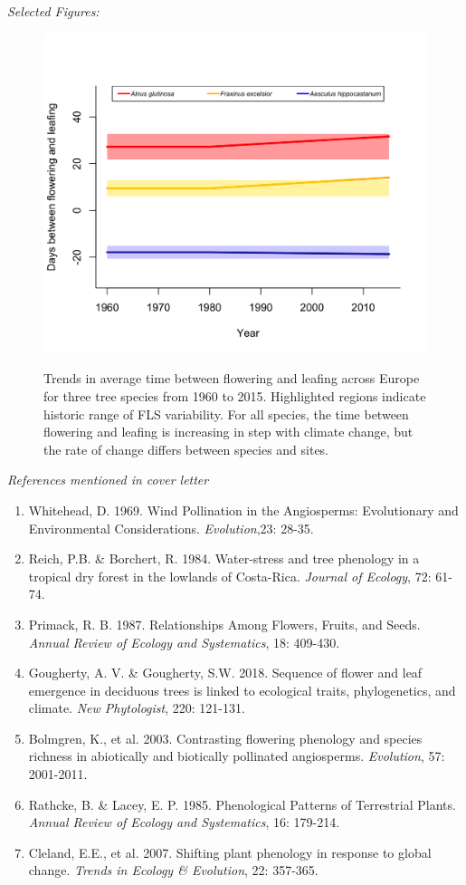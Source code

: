 \documentclass[10.5pt,a4paper]{letter}\usepackage[]{graphicx}\usepackage[]{color}
\begin{document}
\noindent \emph{Selected Figures:}\\
   \begin{figure}
 \includegraphics[width=.75\textwidth]{..//figure/FLS_climate_change.png}\\
\caption{Trends in average time between flowering and leafing across Europe for three tree species from 1960 to 2015. Highlighted regions indicate historic range of FLS variability. For all species, the time between flowering and leafing is increasing in step with climate change, but the rate of change differs between species and sites.}
    \label{fig:Figure 1}
    \end{figure}

\newpage
\noindent \emph{References mentioned in cover letter}
\begin{footnotesize}
\begin{enumerate}
\item Whitehead, D. 1969. Wind Pollination in the Angiosperms: Evolutionary and Environmental Considerations. \emph{Evolution},23: 28-35.
\item Reich, P.B. \& Borchert, R. 1984. Water-stress and tree phenology in a tropical dry forest in the lowlands of Costa-Rica. \emph{Journal of Ecology}, 72: 61-74.
\item Primack, R. B. 1987. Relationships Among Flowers, Fruits, and Seeds. \emph{Annual Review of Ecology and Systematics}, 18: 409-430.
\item Gougherty, A. V. \& Gougherty, S.W. 2018. Sequence of flower and leaf emergence in deciduous trees is linked to ecological traits, phylogenetics, and climate. \emph{New Phytologist}, 220: 121-131.
\item Bolmgren, K., et al. 2003. Contrasting flowering phenology and species richness in abiotically and biotically pollinated angiosperms. \emph{Evolution}, 57: 2001-2011.
\item Rathcke, B. \& Lacey, E. P. 1985. Phenological Patterns of Terrestrial Plants. \emph{Annual Review of Ecology and Systematics}, 16: 179-214.
\item Cleland, E.E., et al. 2007. Shifting plant phenology in response to global change. \emph{Trends in Ecology & Evolution}, 22: 357-365.
\end{enumerate}
\end{footnotesize}
\end{document}
